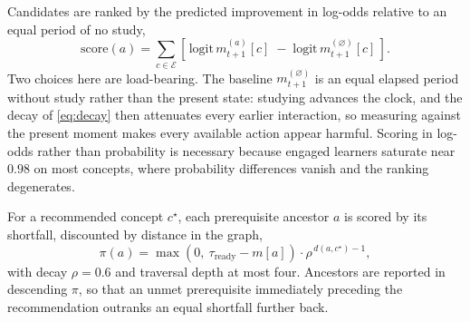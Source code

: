 Candidates are ranked by the predicted improvement in log-odds relative to an equal
period of no study,
%
\begin{equation}
\mathrm{score}(a) = \sum_{c \in \mathcal{E}}
\left[\,
\mathrm{logit}\, m^{(a)}_{t+1}[c] \;-\; \mathrm{logit}\, m^{(\varnothing)}_{t+1}[c]
\,\right].
\label{eq:score}
\end{equation}
%
Two choices here are load-bearing. The baseline $m^{(\varnothing)}_{t+1}$ is an equal
elapsed period without study rather than the present state: studying advances the
clock, and the decay of \eqref{eq:decay} then attenuates every earlier interaction, so
measuring against the present moment makes every available action appear harmful.
Scoring in log-odds rather than probability is necessary because engaged learners
saturate near $0.98$ on most concepts, where probability differences vanish and the
ranking degenerates.

For a recommended concept $c^\star$, each prerequisite ancestor $a$ is scored by its
shortfall, discounted by distance in the graph,
%
\begin{equation}
\pi(a) = \max\!\left(0,\ \tau_{\text{ready}} - m[a]\right)\cdot \rho^{\,d(a, c^\star) - 1},
\label{eq:priority}
\end{equation}
%
with decay $\rho = 0.6$ and traversal depth at most four. Ancestors are reported in
descending $\pi$, so that an unmet prerequisite immediately preceding the
recommendation outranks an equal shortfall further back.


